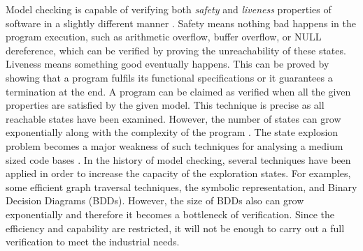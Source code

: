 Model checking is capable of verifying both \textit{safety} and \textit{liveness} properties of software in a slightly different manner \cite{4544862}. Safety means nothing bad happens in the program execution, such as arithmetic overflow, buffer overflow, or NULL dereference, which can be verified by proving the unreachability of these states. Liveness means something good eventually happens. This can be proved by showing that a program fulfils its functional specifications or it guarantees a termination at the end. A program can be claimed as verified when all the given properties are satisfied by the given model. This technique is precise as all reachable states have been examined. However, the number of states can grow exponentially along with the complexity of the program \cite{Clarke:2001:BMC:510986.510987, biere2003bounded}. The state explosion problem becomes a major weakness of such techniques for analysing a medium sized code bases \cite{Yeolekar2013}. In the history of model checking, several techniques have been applied in order to increase the capacity of the exploration states. For examples, some efficient graph traversal techniques, the symbolic representation, and Binary Decision Diagrams (BDDs). %
However, the size of BDDs also can grow exponentially and therefore it becomes a bottleneck of verification. Since the efficiency and capability are restricted, it will not be enough to carry out a full verification to meet the industrial needs.

